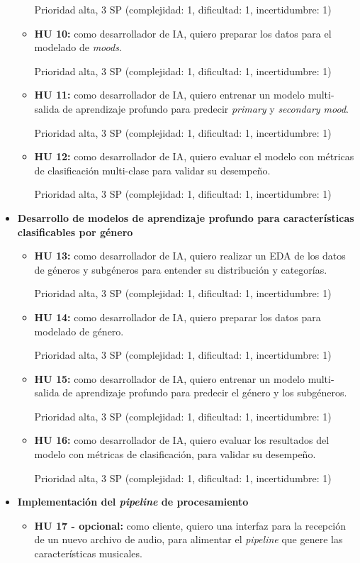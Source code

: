 \documentclass[
11pt, %
]{charter}
\begin{document}
\begin{itemize}
\begin{itemize}
      Prioridad alta, 3 SP (complejidad: 1, dificultad: 1, incertidumbre: 1)
      \item \textbf{HU 10:}
      como desarrollador de IA, quiero preparar los datos para el modelado de \textit{moods}.
      
      Prioridad alta, 3 SP (complejidad: 1, dificultad: 1, incertidumbre: 1)
      \item \textbf{HU 11:}
      como desarrollador de IA, quiero entrenar un modelo multi-salida de aprendizaje profundo para predecir \textit{primary} y \textit{secondary mood}.
      
      Prioridad alta, 3 SP (complejidad: 1, dificultad: 1, incertidumbre: 1)
      \item \textbf{HU 12:}
      como desarrollador de IA, quiero evaluar el modelo con métricas de clasificación multi-clase para validar su desempeño.
      
      Prioridad alta, 3 SP (complejidad: 1, dificultad: 1, incertidumbre: 1)
      \vspace{2cm}
    \end{itemize}

  \item \textbf{Desarrollo de modelos de aprendizaje profundo para características clasificables por género}
    \begin{itemize}
      \item \textbf{HU 13:}
      como desarrollador de IA, quiero realizar un EDA de los datos de géneros y subgéneros para entender su distribución y categorías.
      
      Prioridad alta, 3 SP (complejidad: 1, dificultad: 1, incertidumbre: 1)
      \item \textbf{HU 14:}
      como desarrollador de IA, quiero preparar los datos para modelado de género.
      
      Prioridad alta, 3 SP (complejidad: 1, dificultad: 1, incertidumbre: 1)
      \item \textbf{HU 15:}
      como desarrollador de IA, quiero entrenar un modelo multi-salida de aprendizaje profundo para predecir el género y los subgéneros.
      
      Prioridad alta, 3 SP (complejidad: 1, dificultad: 1, incertidumbre: 1)
      \item \textbf{HU 16:}
      como desarrollador de IA, quiero evaluar los resultados del modelo con métricas de clasificación, para validar su desempeño.
      
      Prioridad alta, 3 SP (complejidad: 1, dificultad: 1, incertidumbre: 1)
    \end{itemize}        
  \item \textbf{Implementación del  \textit{pipeline} de procesamiento}
    \begin{itemize}
      \item \textbf{HU 17 - opcional:}
      como cliente, quiero una interfaz para la recepción de un nuevo archivo de audio, para alimentar el \textit{pipeline} que genere las características musicales.
      

\end{itemize}
\end{itemize}
\end{document}
